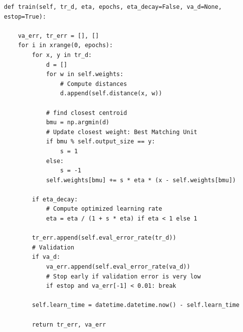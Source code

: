 \documentclass[11pt]{article}
\begin{document}
\begin{lstlisting}
def train(self, tr_d, eta, epochs, eta_decay=False, va_d=None, estop=True):
	
	va_err, tr_err = [], []
	for i in xrange(0, epochs):
		for x, y in tr_d:
		    d = []
		    for w in self.weights:
		        # Compute distances
		        d.append(self.distance(x, w))

		    # find closest centroid
		    bmu = np.argmin(d)
		    # Update closest weight: Best Matching Unit
		    if bmu % self.output_size == y: 
		    	s = 1
		    else: 
		    	s = -1
		    self.weights[bmu] += s * eta * (x - self.weights[bmu])
		    
		if eta_decay:
            # Compute optimized learning rate
            eta = eta / (1 + s * eta) if eta < 1 else 1
            
        tr_err.append(self.eval_error_rate(tr_d))
        # Validation
        if va_d:
            va_err.append(self.eval_error_rate(va_d))
            # Stop early if validation error is very low
            if estop and va_err[-1] < 0.01: break

        self.learn_time = datetime.datetime.now() - self.learn_time
        
        return tr_err, va_err
\end{lstlisting}

\newpage
\end{document}

